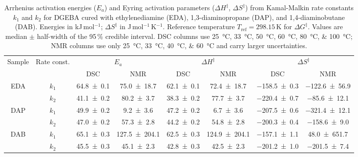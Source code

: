 \begin{table}[!ht]
\caption{Arrhenius activation energies ($E_a$) and Eyring activation parameters ($\Delta H^\ddagger$, $\Delta S^\ddagger$) from Kamal-Malkin rate constants $k_1$ and $k_2$ for DGEBA cured with ethylenediamine (EDA), 1,3-diaminopropane (DAP), and 1,4-diaminobutane (DAB). Energies in kJ\,mol$^{-1}$; $\Delta S^\ddagger$ in J\,mol$^{-1}$\,K$^{-1}$. Reference temperature $T_\mathrm{ref} = 298.15$\,K for $\Delta G^\ddagger$. Values are median $\pm$ half-width of the 95\,\% credible interval. DSC columns use \qtylist[list-units=single]{25;33;50;60;80;100}{\celsius}; NMR columns use only \qtylist[list-units=single]{25;33;40;60}{\celsius} and carry larger uncertainties.}
\label{tab:Ea_eyring}
    \centering
    \begin{tabular}{cc|cc|cc|cc}
        \multirow{2}{*}{Sample} & \multirow{2}{*}{Rate const.} & \multicolumn{2}{c|}{$E_a$} & \multicolumn{2}{c|}{$\Delta H^\ddagger$} & \multicolumn{2}{c}{$\Delta S^\ddagger$} \\
        & & DSC & NMR & DSC & NMR & DSC & NMR \\ \midrule
        \multirow{2}{*}{EDA} & $k_1$ & \num{64.8 \pm 0.1} & \num{75.0 \pm 18.7} & \num{62.1 \pm 0.1} & \num{72.4 \pm 18.7} & \num{-158.5 \pm 0.3} & \num{-122.6 \pm 56.9} \\
        ~ & $k_2$ & \num{41.1 \pm 0.2} & \num{80.2 \pm 3.7} & \num{38.3 \pm 0.2} & \num{77.7 \pm 3.7} & \num{-220.4 \pm 0.7} & \num{-85.6 \pm 12.1} \\ \midrule
        \multirow{2}{*}{DAP} & $k_1$ & \num{49.9 \pm 0.2} & \num{9.2 \pm 3.6} & \num{47.2 \pm 0.2} & \num{6.7 \pm 3.6} & \num{-207.5 \pm 0.6} & \num{-321.4 \pm 12.1} \\
        ~ & $k_2$ & \num{47.0 \pm 0.2} & \num{57.3 \pm 2.8} & \num{44.2 \pm 0.2} & \num{54.8 \pm 2.8} & \num{-200.3 \pm 0.4} & \num{-158.6 \pm 9.0} \\ \midrule
        \multirow{2}{*}{DAB} & $k_1$ & \num{65.1 \pm 0.3} & \num{127.5 \pm 204.1} & \num{62.5 \pm 0.3} & \num{124.9 \pm 204.1} & \num{-157.1 \pm 1.1} & \num{48.0 \pm 651.7} \\
        ~ & $k_2$ & \num{45.5 \pm 0.3} & \num{45.1 \pm 2.3} & \num{42.8 \pm 0.3} & \num{42.5 \pm 2.3} & \num{-201.2 \pm 1.0} & \num{-201.5 \pm 7.4} \\
    \end{tabular}
\end{table}
